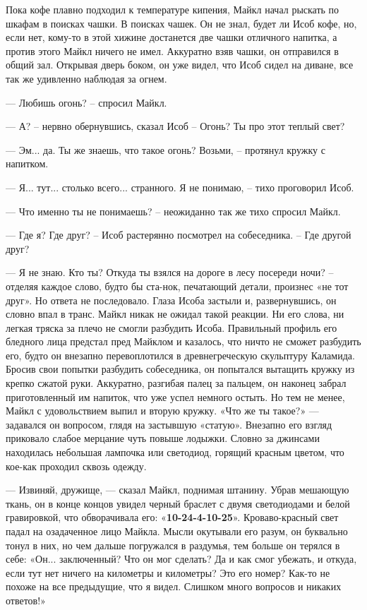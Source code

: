 Пока кофе плавно подходил к температуре кипения, Майкл начал рыскать по шкафам в поисках чашки. В поисках чашек. Он не знал, будет ли Исоб кофе, но, если нет, кому-то в этой хижине достанется две чашки отличного напитка, а против этого Майкл ничего не имел. Аккуратно взяв чашки, он отправился в общий зал. Открывая дверь боком, он уже видел, что Исоб сидел на диване, все так же удивленно наблюдая за огнем.

— Любишь огонь? – спросил Майкл.

— А? – нервно обернувшись, сказал Исоб – Огонь? Ты про этот теплый свет?

— Эм... да. Ты же знаешь, что такое огонь? Возьми, – протянул кружку с напитком.

— Я... тут... столько всего... странного. Я не понимаю, – тихо проговорил Исоб.

— Что именно ты не понимаешь? – неожиданно так же тихо спросил Майкл.

— Где я? Где друг? – Исоб растерянно посмотрел на собеседника. – Где другой друг?

— Я не знаю. Кто ты? Откуда ты взялся на дороге в лесу посереди ночи? – отделяя каждое слово, будто бы ста-нок, печатающий детали, произнес «не тот друг». Но ответа не последовало. Глаза Исоба застыли и, развернувшись, он словно впал в транс. Майкл никак не ожидал такой реакции. Ни его слова, ни легкая тряска за плечо не смогли разбудить Исоба. Правильный профиль его бледного лица предстал пред Майклом и казалось, что ничто не сможет разбудить его, будто он внезапно перевоплотился в древнегреческую скульптуру Каламида. Бросив свои попытки разбудить собеседника, он попытался вытащить кружку из крепко сжатой руки. Аккуратно, разгибая палец за пальцем, он наконец забрал приготовленный им напиток, что уже успел немного остыть. Но тем не менее, Майкл с удовольствием выпил и вторую кружку. «Что же ты такое?» — задавался он вопросом, глядя на застывшую «статую». Внезапно его взгляд приковало слабое мерцание чуть повыше лодыжки. Словно за джинсами находилась небольшая лампочка или светодиод, горящий красным цветом, что кое-как проходил сквозь одежду. 

— Извиняй, дружище, — сказал Майкл, поднимая штанину. Убрав мешающую ткань, он в конце концов увидел черный браслет с двумя светодиодами и белой гравировкой, что обворачивала его: «\textbf{10-24-4-10-25}».  Кроваво-красный свет падал на озадаченное лицо Майкла. Мысли окутывали его разум, он буквально тонул в них, но чем дальше погружался в раздумья, тем больше он терялся в себе: «Он... заключенный? Что он мог сделать? Да и как смог убежать, и откуда, если тут нет ничего на километры и километры? Это его номер? Как-то не похоже на все предыдущие, что я видел. Слишком много вопросов и никаких ответов!»

